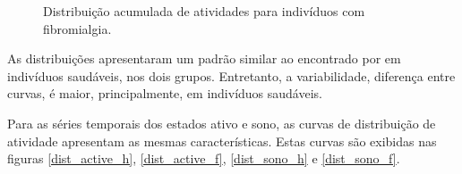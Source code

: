 \documentclass{ufscThesis}
\begin{document}
\begin{figure}[!h]
\center
{}
\quad
{}
\caption{Distribuição acumulada de atividades para indivíduos com fibromialgia.}
\label{dist_f}
\end{figure}

As distribuições apresentaram um padrão similar ao encontrado por  em indivíduos saudáveis, nos dois grupos. Entretanto, a variabilidade, diferença entre curvas, é maior, principalmente, em indivíduos saudáveis.\par
Para as séries temporais dos estados ativo e sono, as curvas de distribuição de atividade apresentam as mesmas características. Estas curvas são exibidas nas figuras \ref{dist_active_h}, \ref{dist_active_f}, \ref{dist_sono_h} e \ref{dist_sono_f}.
\end{document}
